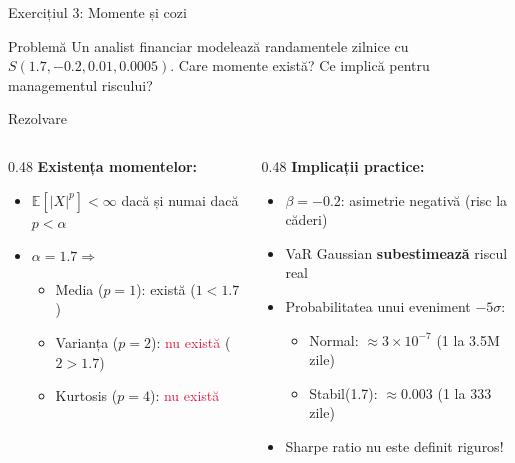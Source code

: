 \documentclass[9pt, aspectratio=169, t]{beamer}
\theoremstyle{definition}
\newcommand{\E}{\mathbb{E}}
\begin{document}
\begin{frame}{Exercițiul 3: Momente și cozi}
\begin{block}{Problemă}
Un analist financiar modelează randamentele zilnice cu $S(1.7, -0.2, 0.01, 0.0005)$. Care momente există? Ce implică pentru managementul riscului?
\end{block}

\begin{exampleblock}{Rezolvare}
\begin{columns}[T]
\begin{column}{0.48\textwidth}
\textbf{Existența momentelor:}
\begin{itemize}
    \item $\E[|X|^p] < \infty$ dacă și numai dacă $p < \alpha$
    \item $\alpha = 1.7 \Rightarrow$
    \begin{itemize}
        \item Media ($p=1$): \textcolor{Forest}{există} ($1 < 1.7$)
        \item Varianța ($p=2$): \textcolor{Crimson}{nu există} ($2 > 1.7$)
        \item Kurtosis ($p=4$): \textcolor{Crimson}{nu există}
    \end{itemize}
\end{itemize}
\end{column}
\begin{column}{0.48\textwidth}
\textbf{Implicații practice:}
\begin{itemize}
    \item $\beta = -0.2$: asimetrie negativă (risc la căderi)
    \item VaR Gaussian \textbf{subestimează} riscul real
    \item Probabilitatea unui eveniment $-5\sigma$:
    \begin{itemize}
        \item Normal: $\approx 3 \times 10^{-7}$ (1 la 3.5M zile)
        \item Stabil(1.7): $\approx 0.003$ (1 la 333 zile)
    \end{itemize}
    \item Sharpe ratio nu este definit riguros!
\end{itemize}
\end{column}
\end{columns}
\end{exampleblock}
\end{frame}

\end{document}
